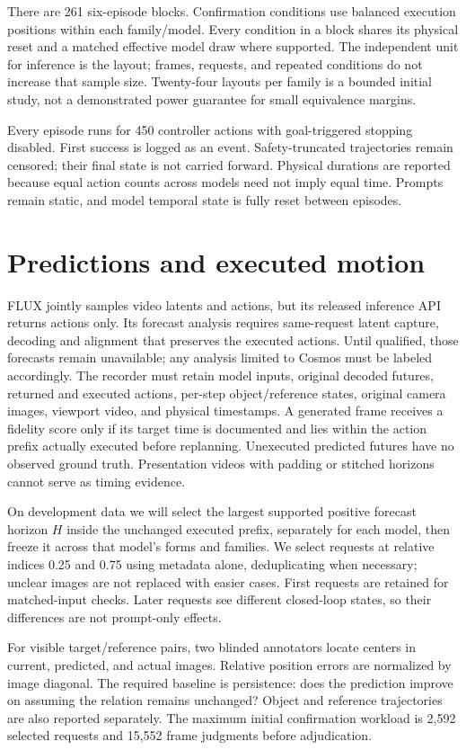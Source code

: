 \documentclass[11pt]{article}
\begin{document}
There are 261 six-episode blocks. Confirmation conditions use balanced execution positions within each family/model. Every condition in a block shares its physical reset and a matched effective model draw where supported. The independent unit for inference is the layout; frames, requests, and repeated conditions do not increase that sample size. Twenty-four layouts per family is a bounded initial study, not a demonstrated power guarantee for small equivalence margins.

Every episode runs for 450 controller actions with goal-triggered stopping disabled. First success is logged as an event. Safety-truncated trajectories remain censored; their final state is not carried forward. Physical durations are reported because equal action counts across models need not imply equal time. Prompts remain static, and model temporal state is fully reset between episodes.

\section{Predictions and executed motion}
FLUX jointly samples video latents and actions, but its released inference API returns actions only. Its forecast analysis requires same-request latent capture, decoding and alignment that preserves the executed actions. Until qualified, those forecasts remain unavailable; any analysis limited to Cosmos must be labeled accordingly.
The recorder must retain model inputs, original decoded futures, returned and executed actions, per-step object/reference states, original camera images, viewport video, and physical timestamps. A generated frame receives a fidelity score only if its target time is documented and lies within the action prefix actually executed before replanning. Unexecuted predicted futures have no observed ground truth. Presentation videos with padding or stitched horizons cannot serve as timing evidence.

On development data we will select the largest supported positive forecast horizon $H$ inside the unchanged executed prefix, separately for each model, then freeze it across that model's forms and families. We select requests at relative indices 0.25 and 0.75 using metadata alone, deduplicating when necessary; unclear images are not replaced with easier cases. First requests are retained for matched-input checks. Later requests see different closed-loop states, so their differences are not prompt-only effects.

For visible target/reference pairs, two blinded annotators locate centers in current, predicted, and actual images. Relative position errors are normalized by image diagonal. The required baseline is persistence: does the prediction improve on assuming the relation remains unchanged? Object and reference trajectories are also reported separately. The maximum initial confirmation workload is 2,592 selected requests and 15,552 frame judgments before adjudication.
\end{document}
